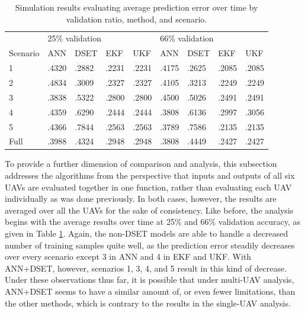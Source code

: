 \documentclass[12pt]{uthesis-v12}  %
\begin{document}
\begin{table}[!t]
\caption{Simulation results evaluating average prediction error over time by validation ratio, method, and scenario.}
\renewcommand{\arraystretch}{1.3}
\centering
{\begin{tabular}{*{9}{l}}
\toprule
& \multicolumn{4}{l}{25\% validation} & \multicolumn{4}{l}{66\% validation} \\
Scenario & ANN & DSET & EKF & UKF & ANN & DSET & EKF & UKF \\ \midrule
1 & .4320 & .2882 & .2231 & .2231 & .4175 & .2625 & .2085 & .2085 \\
2 & .4834 & .3009 & .2327 & .2327 & .4105 & .3213 & .2249 & .2249 \\
3 & .3838 & .5322 & .2800 & .2800 & .4500 & .5026 & .2491 & .2491 \\
4 & .4359 & .6290 & .2444 & .2444 & .3808 & .6136 & .2997 & .3056 \\
5 & .4366 & .7844 & .2563 & .2563 & .3789 & .7586 & .2135 & .2135 \\
Full & .3988 & .4324 & .2948 & .2948 & .3808 & .4449 & .2427 & .2427 \\ \bottomrule
\end{tabular}}

\label{val-multi}
\end{table}

To provide a further dimension of comparison and analysis, this subsection addresses the algorithms from the perspective that inputs and outputs of all six UAVs are evaluated together in one function, rather than evaluating each UAV individually as was done previously. In both cases, however, the results are averaged over all the UAVs for the sake of consistency. Like before, the analysis begins with the average results over time at 25\% and 66\% validation accuracy, as given in Table \ref{val-multi}. Again, the non-DSET models are able to handle a decreased number of training samples quite well, as the prediction error steadily decreases over every scenario except 3 in ANN and 4 in EKF and UKF. With ANN+DSET, however, scenarios 1, 3, 4, and 5 result in this kind of decrease. Under these observations thus far, it is possible that under multi-UAV analysis, ANN+DSET seems to have a similar amount of, or even fewer limitations, than the other methods, which is contrary to the results in the single-UAV analysis.
\end{document}
